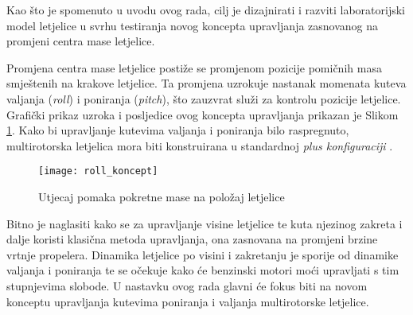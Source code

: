 \documentclass[11pt,a4paper]{article}
\begin{document}
Kao što je spomenuto u uvodu ovog rada, cilj je dizajnirati i razviti laboratorijski model letjelice u svrhu testiranja novog koncepta upravljanja zasnovanog na promjeni centra mase letjelice. 

\medskip

Promjena centra mase letjelice postiže se promjenom pozicije pomičnih masa smještenih na krakove letjelice. Ta promjena uzrokuje nastanak momenata kuteva  valjanja (\textit{roll}) i poniranja (\textit{pitch}), što zauzvrat služi za kontrolu pozicije letjelice. Grafički prikaz uzroka i posljedice ovog koncepta upravljanja prikazan je Slikom \ref{fig:kontrol}. Kako bi upravljanje kutevima valjanja i poniranja bilo raspregnuto, multirotorska letjelica mora biti konstruirana u standardnoj \textit{plus konfiguraciji} \cite{haus1}.

\bigskip

\begin{figure}[H]
	\centering
	\texttt{[image: roll\_koncept]}
	\caption{Utjecaj pomaka pokretne mase na položaj letjelice}
	\label{fig:kontrol}
\end{figure}


Bitno je naglasiti kako se za upravljanje visine letjelice te kuta njezinog zakreta i dalje koristi klasična metoda upravljanja, ona zasnovana na promjeni brzine vrtnje propelera. Dinamika letjelice po visini i zakretanju je sporije od dinamike valjanja i poniranja te se očekuje kako će benzinski motori moći upravljati s tim stupnjevima slobode. U nastavku ovog rada glavni će fokus biti na novom konceptu upravljanja kutevima poniranja i valjanja multirotorske letjelice. 
\end{document}
